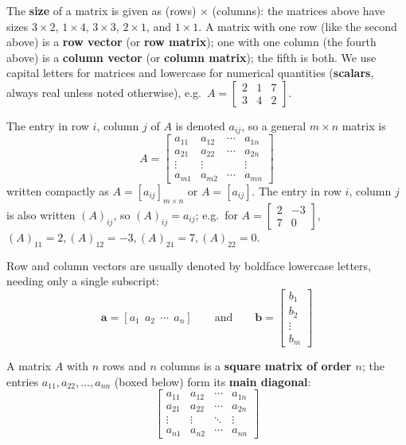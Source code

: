 \documentclass{article}
\theoremstyle{mystyle}
\begin{document}
The \textbf{size} of a matrix is given as (rows) $\times$ (columns): the matrices above have sizes $3\times2$, $1\times4$, $3\times3$, $2\times1$, and $1\times1$. A matrix with one row (like the second above) is a \textbf{row vector} (or \textbf{row matrix}); one with one column (the fourth above) is a \textbf{column vector} (or \textbf{column matrix}); the fifth is both. We use capital letters for matrices and lowercase for numerical quantities (\textbf{scalars}, always real unless noted otherwise), e.g.\ $A=\begin{bmatrix}2&1&7\\3&4&2\end{bmatrix}$.

The entry in row $i$, column $j$ of $A$ is denoted $a_{ij}$, so a general $m\times n$ matrix is
\[
A=\begin{bmatrix}a_{11}&a_{12}&\cdots&a_{1n}\\a_{21}&a_{22}&\cdots&a_{2n}\\\vdots&\vdots& &\vdots\\a_{m1}&a_{m2}&\cdots&a_{mn}\end{bmatrix} \tag{1}
\]
written compactly as $A=[a_{ij}]_{m\times n}$ or $A=[a_{ij}]$. The entry in row $i$, column $j$ is also written $(A)_{ij}$, so $(A)_{ij}=a_{ij}$; e.g.\ for $A=\begin{bmatrix}2&-3\\7&0\end{bmatrix}$, $(A)_{11}=2,(A)_{12}=-3,(A)_{21}=7,(A)_{22}=0$.

Row and column vectors are usually denoted by boldface lowercase letters, needing only a single subscript:
\[
\mathbf{a}=[a_1\ \ a_2\ \ \cdots\ \ a_n]\qquad\text{and}\qquad \mathbf{b}=\begin{bmatrix}b_1\\b_2\\\vdots\\b_m\end{bmatrix}
\]

A matrix $A$ with $n$ rows and $n$ columns is a \textbf{square matrix of order $n$}; the entries $a_{11},a_{22},\dots,a_{nn}$ (boxed below) form its \textbf{main diagonal}:
\[
\begin{bmatrix}\boxed{a_{11}}&a_{12}&\cdots&a_{1n}\\a_{21}&\boxed{a_{22}}&\cdots&a_{2n}\\\vdots&\vdots& \ddots&\vdots\\a_{n1}&a_{n2}&\cdots&\boxed{a_{nn}}\end{bmatrix} \tag{2}
\]
\end{document}
